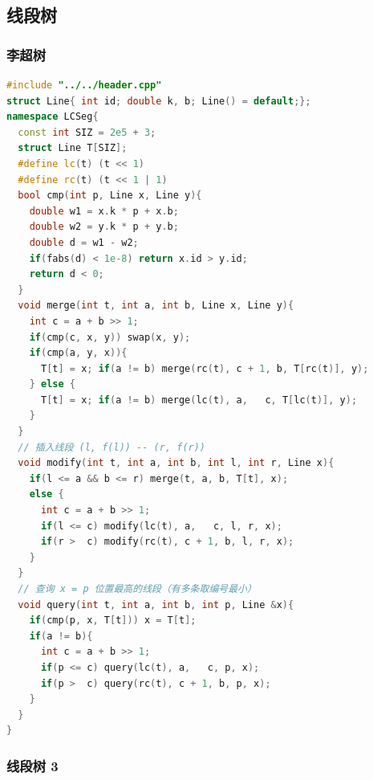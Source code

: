 \documentclass[10pt]{ctexart}
\begin{document}
\begin{multicols}{3}
    \subsection{线段树}\label{ux7ebfux6bb5ux6811}

    \subsubsection{李超树}\label{ux674eux8d85ux6811}

\begin{lstlisting}[language={C++}]
#include "../../header.cpp"
struct Line{ int id; double k, b; Line() = default;};
namespace LCSeg{
  const int SIZ = 2e5 + 3;
  struct Line T[SIZ];
  #define lc(t) (t << 1)
  #define rc(t) (t << 1 | 1)
  bool cmp(int p, Line x, Line y){
    double w1 = x.k * p + x.b;
    double w2 = y.k * p + y.b;
    double d = w1 - w2;
    if(fabs(d) < 1e-8) return x.id > y.id;
    return d < 0;
  }
  void merge(int t, int a, int b, Line x, Line y){
    int c = a + b >> 1;
    if(cmp(c, x, y)) swap(x, y);
    if(cmp(a, y, x)){
      T[t] = x; if(a != b) merge(rc(t), c + 1, b, T[rc(t)], y);
    } else {
      T[t] = x; if(a != b) merge(lc(t), a,   c, T[lc(t)], y);
    }
  }
  // 插入线段 (l, f(l)) -- (r, f(r))
  void modify(int t, int a, int b, int l, int r, Line x){
    if(l <= a && b <= r) merge(t, a, b, T[t], x);
    else {
      int c = a + b >> 1;
      if(l <= c) modify(lc(t), a,   c, l, r, x);
      if(r >  c) modify(rc(t), c + 1, b, l, r, x);
    }
  }
  // 查询 x = p 位置最高的线段（有多条取编号最小）
  void query(int t, int a, int b, int p, Line &x){
    if(cmp(p, x, T[t])) x = T[t];
    if(a != b){
      int c = a + b >> 1;
      if(p <= c) query(lc(t), a,   c, p, x);
      if(p >  c) query(rc(t), c + 1, b, p, x);
    }
  }
}
\end{lstlisting}

    \subsubsection{线段树 3}\label{ux7ebfux6bb5ux6811-3}


\end{multicols}
\end{document}
